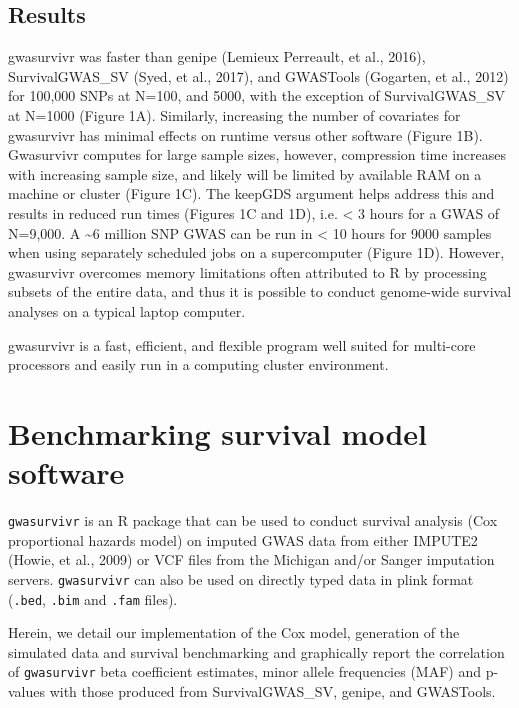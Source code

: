 \documentclass[]{DissertateUSU}
\begin{document}
\section{Results}\label{results-1}

gwasurvivr was faster than genipe (Lemieux Perreault, et al., 2016),
SurvivalGWAS\_SV (Syed, et al., 2017), and GWASTools (Gogarten, et al.,
2012) for 100,000 SNPs at N=100, and 5000, with the exception of
SurvivalGWAS\_SV at N=1000 (Figure 1A). Similarly, increasing the number
of covariates for gwasurvivr has minimal effects on runtime versus other
software (Figure 1B). Gwasurvivr computes for large sample sizes,
however, compression time increases with increasing sample size, and
likely will be limited by available RAM on a machine or cluster (Figure
1C). The keepGDS argument helps address this and results in reduced run
times (Figures 1C and 1D), i.e. \textless{} 3 hours for a GWAS of
N=9,000. A \textasciitilde{}6 million SNP GWAS can be run in \textless{}
10 hours for 9000 samples when using separately scheduled jobs on a
supercomputer (Figure 1D). However, gwasurvivr overcomes memory
limitations often attributed to R by processing subsets of the entire
data, and thus it is possible to conduct genome-wide survival analyses
on a typical laptop computer.

gwasurvivr is a fast, efficient, and flexible program well suited for
multi-core processors and easily run in a computing cluster environment.

\FloatBarrier

\newpage

\pagestyle{plain} \fancyhead[L]{} \fancyhead[R]{}
\fancyfoot[C]{\thepage}

\chapter{Benchmarking survival model software}

\texttt{gwasurvivr} is an R package that can be used to conduct survival
analysis (Cox proportional hazards model) on imputed GWAS data from
either IMPUTE2 (Howie, et al., 2009) or VCF files from the Michigan
and/or Sanger imputation servers. \texttt{gwasurvivr} can also be used
on directly typed data in plink format (\texttt{.bed}, \texttt{.bim} and
\texttt{.fam} files).

Herein, we detail our implementation of the Cox model, generation of the
simulated data and survival benchmarking and graphically report the
correlation of \texttt{gwasurvivr} beta coefficient estimates, minor
allele frequencies (MAF) and p-values with those produced from
SurvivalGWAS\_SV, genipe, and GWASTools.
\end{document}
